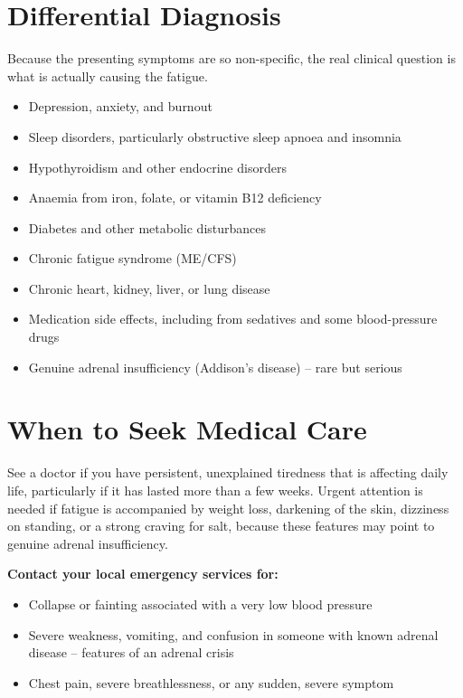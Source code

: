 \section*{Differential Diagnosis}
Because the presenting symptoms are so non-specific, the real clinical question is what is actually causing the fatigue.

\begin{itemize}
    \item Depression, anxiety, and burnout
    \item Sleep disorders, particularly obstructive sleep apnoea and insomnia
    \item Hypothyroidism and other endocrine disorders
    \item Anaemia from iron, folate, or vitamin B12 deficiency
    \item Diabetes and other metabolic disturbances
    \item Chronic fatigue syndrome (ME/CFS)
    \item Chronic heart, kidney, liver, or lung disease
    \item Medication side effects, including from sedatives and some blood-pressure drugs
    \item Genuine adrenal insufficiency (Addison's disease) -- rare but serious
\end{itemize}

\section*{When to Seek Medical Care}
See a doctor if you have persistent, unexplained tiredness that is affecting daily life, particularly if it has lasted more than a few weeks. Urgent attention is needed if fatigue is accompanied by weight loss, darkening of the skin, dizziness on standing, or a strong craving for salt, because these features may point to genuine adrenal insufficiency.

\textbf{Contact your local emergency services for:}
\begin{itemize}
    \item Collapse or fainting associated with a very low blood pressure
    \item Severe weakness, vomiting, and confusion in someone with known adrenal disease -- features of an adrenal crisis
    \item Chest pain, severe breathlessness, or any sudden, severe symptom
\end{itemize}

